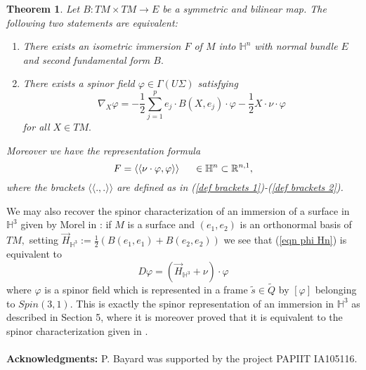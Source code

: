 \documentclass{amsart}
\newtheorem{thm}{Theorem}
\begin{document}
\begin{thm}\label{thm Hn}
Let $B:TM\times TM\rightarrow E$ be a symmetric and bilinear map. The following two statements are equivalent:
\begin{enumerate}
\item There exists an isometric immersion $F$ of $M$ into $\mathbb{H}^n$ with normal bundle $E$ and second fundamental form $B.$
\item There exists a spinor field $\varphi\in\Gamma(U\Sigma)$ satisfying
\begin{equation}\label{eqn phi Hn}
\nabla_X\varphi=-\frac{1}{2}\sum_{j=1}^pe_j\cdot B(X,e_j)\cdot\varphi-\frac{1}{2} X\cdot\nu\cdot\varphi\end{equation}
for all $X\in TM.$
\end{enumerate}
Moreover we have the representation formula
\begin{equation}\label{formula F Hn}
F=\langle\langle\nu\cdot\varphi,\varphi\rangle\rangle\hspace{.5cm}\in \mathbb{H}^n\subset{\mathbb{R}}^{n,1},
\end{equation}
where the brackets $\langle\langle.,.\rangle\rangle$ are defined as in (\ref{def brackets 1})-(\ref{def brackets 2}).
\end{thm}
We may also recover the spinor characterization of an immersion of a surface in $\mathbb{H}^3$ given by Morel in \cite{Mo}: if $M$ is a surface and $(e_1,e_2)$ is an orthonormal basis of $TM,$ setting $\vec H_{\mathbb H^3}:=\frac{1}{2}\left(B(e_1,e_1)+B(e_2,e_2)\right)$ we see that (\ref{eqn phi Hn}) is equivalent to
$$D\varphi=(\vec H_{\mathbb H^3}+\nu)\cdot\varphi$$
where $\varphi$ is a spinor field which is represented in a frame $\tilde{s}\in\tilde{Q}$ by $[\varphi]$ belonging to $Spin(3,1).$ This is exactly the spinor representation of an immersion in $\mathbb{H}^3$ as described in \cite{Bay} Section 5, where it is moreover proved that it is equivalent to the spinor characterization given in \cite{Mo}. 
\\
\\\textbf{Acknowledgments:} P. Bayard was supported by the project PAPIIT IA105116.
\end{document}
